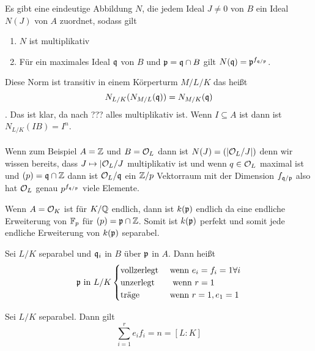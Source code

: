 \begin{Bsp}
	Es gibt eine eindeutige Abbildung \(N\), die jedem Ideal \(J\neq 0\) von \(B\) ein Ideal \(N(J)\) von \(A\) zuordnet, sodass gilt
	\begin{enumerate}
		\item \(N\) ist multiplikativ
		\item Für ein maximales Ideal \(\mathfrak{q}\) von \(B\) und \(\mathfrak{p}=\mathfrak{q}\cap B\) gilt \(N(\mathfrak{q})=\mathfrak{p}^{f_{\mathfrak{q}/\mathfrak{p}}}\).
	\end{enumerate}
	Diese Norm ist transitiv in einem Körperturm \(M/L/K\)
	das heißt \[N_{L/K}(N_{M/L}(\mathfrak{q}))=N_{M/K}(\mathfrak{q})\].
	Das ist klar, da nach ??? alles multiplikativ ist.
	Wenn \(I\subseteq A\) ist dann ist \(N_{L/K}(IB)=I^n\).\\~\\
	Wenn zum Beispiel \(A=\mathbb{Z}\) und \(B=\mathcal{O}_L\) dann ist 
	\(N(J)=(|\mathcal{O}_L/J|)\) denn wir wissen bereits, dass 
	\(J\mapsto |\mathcal{O}_L/J\) multiplikativ ist und 
	wenn \(q\in\mathcal{O}_L\) maximal ist und \((p)=\mathfrak{q}\cap\mathbb{Z}\)
	dann ist \(\mathcal{O}_L/\mathfrak{q}\) ein \(\mathbb{Z}/p\) Vektorraum mit der Dimension \(f_{\mathfrak{q}/\mathfrak{p}}\) also hat 
	\(\mathcal{O}_L\) genau \(p^{f_{\mathfrak{q}/\mathfrak{p}}}\) viele Elemente.
\end{Bsp}
\begin{Bem}
	Wenn \(A=\mathcal{O}_K\) ist für \(K/\mathbb{Q}\) endlich, dann ist 
	\(k(\mathfrak{p})\) endlich da eine endliche Erweiterung von \(\mathbb{F}_p\) für \((p)=\mathfrak{p}\cap \mathbb{Z}\). Somit ist \(k(\mathfrak{p})\) perfekt und somit jede endliche Erweiterung von \(k(\mathfrak{p})\) separabel.
\end{Bem}
\begin{Def}
	Sei \(L/K\) separabel und \(\mathfrak{q}_i\) in \(B\) über \(\mathfrak{p}\) in \(A\).
	Dann heißt
	\[\mathfrak{p} \text{ in \(L/K\)}\begin{cases}
		\text{vollzerlegt } & \text{wenn } e_i=f_i=1 \forall i\\
		\text{unzerlegt } & \text{ wenn } r=1\\
		\text{träge } & \text{wenn }r=1,e_1=1
		\end{cases}
		\]
\end{Def}
\begin{Satz}
	Sei \(L/K\) separabel. Dann gilt
	\[\sum_{i=1}^re_if_i=n=[L\colon K]\]
\end{Satz}
